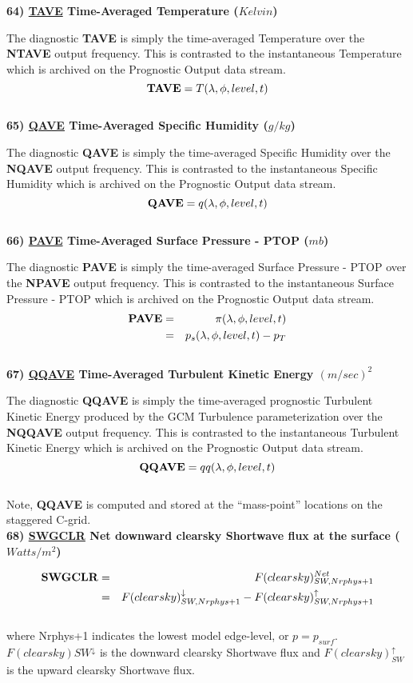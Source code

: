 \noindent
{\bf 64)  \underline {TAVE} Time-Averaged Temperature ($Kelvin$) }

\noindent
The diagnostic {\bf TAVE} is simply the time-averaged Temperature over
the {\bf NTAVE} output frequency.  This is contrasted to the instantaneous
Temperature which is archived on the Prognostic Output data stream.
\[
{\bf TAVE} = T(\lambda, \phi, level , t)
\]
\\

\noindent
{\bf 65)  \underline {QAVE} Time-Averaged Specific Humidity ($g/kg$) }

\noindent
The diagnostic {\bf QAVE} is simply the time-averaged Specific Humidity over
the {\bf NQAVE} output frequency.  This is contrasted to the instantaneous
Specific Humidity which is archived on the Prognostic Output data stream.
\[
{\bf QAVE} = q(\lambda, \phi, level , t)
\]
\\

\noindent
{\bf 66)  \underline {PAVE} Time-Averaged Surface Pressure - PTOP ($mb$) }

\noindent
The diagnostic {\bf PAVE} is simply the time-averaged Surface Pressure - PTOP over
the {\bf NPAVE} output frequency.  This is contrasted to the instantaneous
Surface Pressure - PTOP which is archived on the Prognostic Output data stream.
\begin{eqnarray*}
{\bf PAVE} & =  & \pi(\lambda, \phi, level , t) \\
           & =  & p_s(\lambda, \phi, level , t) - p_T
\end{eqnarray*}
\\

 
\noindent
{\bf 67)  \underline {QQAVE} Time-Averaged Turbulent Kinetic Energy $(m/sec)^2$ }
 
\noindent
The diagnostic {\bf QQAVE} is simply the time-averaged prognostic Turbulent Kinetic Energy 
produced by the GCM Turbulence parameterization over
the {\bf NQQAVE} output frequency.  This is contrasted to the instantaneous
Turbulent Kinetic Energy which is archived on the Prognostic Output data stream.
\[
{\bf QQAVE} = qq(\lambda, \phi, level , t)
\]
\\
Note, {\bf QQAVE} is computed and stored at the ``mass-point'' locations on the staggered C-grid.
\\
 
\noindent
{\bf 68)  \underline {SWGCLR} Net downward clearsky Shortwave flux at the surface ($Watts/m^2$) }

\noindent
\begin{eqnarray*}
{\bf SWGCLR} & =  & F(clearsky)_{SW,Nrphys+1}^{Net} \\
             & =  & F(clearsky)_{SW,Nrphys+1}^\downarrow - F(clearsky)_{SW,Nrphys+1}^\uparrow
\end{eqnarray*}
\noindent
\\
where Nrphys+1 indicates the lowest model edge-level, or $p = p_{surf}$.
$F(clearsky){SW}^\downarrow$ is
the downward clearsky Shortwave flux and $F(clearsky)_{SW}^\uparrow$ is 
the upward clearsky Shortwave flux.
\\

